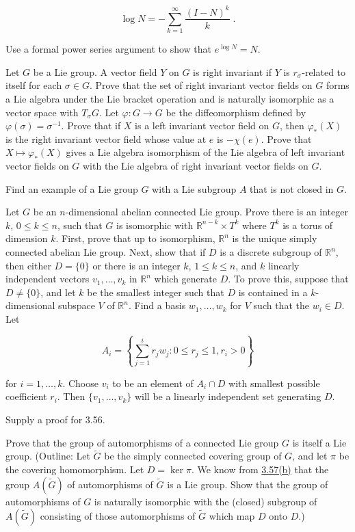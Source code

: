 \begin{problemset}
\[
\log N=-\sum_{k=1}^{\infty}\frac{(I-N)^{k}}{k}\;.
\]

Use a formal power series argument to show that  $ e^{\log N} = N $.

\item Let $G$ be a Lie group. A vector field $Y$ on $G$ is right invariant if $Y$ is $r_\sigma$-related to itself for each $\sigma\in G$. Prove that the set of right invariant vector fields on $G$ forms a Lie algebra under the Lie bracket operation and is naturally isomorphic as a vector space with $T_{\sigma} G$. Let $\varphi: G\to G$ be the diffeomorphism defined by $\varphi(\sigma)=\sigma^{-1}$. Prove that if $X$ is a left invariant vector field on $G$, then $\varphi_{*}(X)$ is the right invariant vector field whose value at $e$ is $-\chi(e)$. Prove that $X\mapsto \varphi_{*}(X)$ gives a Lie algebra isomorphism of the Lie algebra of left invariant vector fields on $G$ with the Lie algebra of right invariant vector fields on $G$. 

\item Find an example of a Lie group $G$ with a Lie subgroup $A$ that is not closed in $G$.

\item Let $G$ be an $n$-dimensional abelian connected Lie group. Prove there is an integer $k$, $0 \leq k \leq n$, such that $G$ is isomorphic with $\mathbb{R}^{n-k} \times T^k$ where $T^k$ is a torus of dimension $k$. First, prove that up to isomorphism, $\mathbb{R}^n$ is the unique simply connected abelian Lie group. Next, show that if $D$ is a discrete subgroup of $\mathbb{R}^n$, then either $D = \{0\}$ or there is an integer $k$, $1 \leq k \leq n$, and $k$ linearly independent vectors $v_1, \ldots, v_k$ in $\mathbb{R}^n$ which generate $D$. To prove this, suppose that $D \neq \{0\}$, and let $k$ be the smallest integer such that $D$ is contained in a $k$-dimensional subspace $V$ of $\mathbb{R}^n$. Find a basis $w_1, \ldots, w_k$ for $V$ such that the $w_i \in D$. Let

\[
A_{i}=\left\{\sum_{j=1}^{i}r_{j}w_{j}\colon0\leq r_{j}\leq1,r_{i}>0\right\}
\]

for $i = 1, \ldots, k$. Choose $v_i$ to be an element of $A_i \cap D$ with smallest possible coefficient $r_i$. Then $\{v_1, \ldots, v_k\}$ will be a linearly independent set generating $D$.

\item Supply a proof for 3.56.

\item Prove that the group of automorphisms of a connected Lie group $G$ is itself a Lie group. (Outline: Let $\tilde{G}$ be the simply connected covering group of $G$, and let $\pi$ be the covering homomorphism. Let $D = \ker \pi$. We know from \hyperref[thm:3.57]{3.57(b)} that the group $A(\tilde{G})$ of automorphisms of $\tilde{G}$ is a Lie group. Show that the group of automorphisms of $G$ is naturally isomorphic with the (closed) subgroup of $A(\tilde{G})$ consisting of those automorphisms of $\tilde{G}$ which map $D$ onto $D$.)


\end{problemset}
